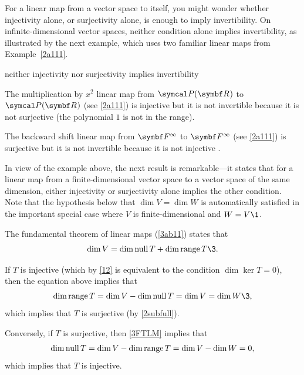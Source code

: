 For a linear map from a vector space to itself, you might wonder whether injectivity alone, or surjectivity alone, is enough to imply invertibility.  On infinite-dimensional vector spaces, neither condition alone implies invertibility, as illustrated by the next example, which uses two familiar linear maps from Example~\ref{2a111}.

\begin{example}[ninsii]{neither injectivity nor surjectivity implies invertibility}
\begin{Itemize}
\item
The multiplication by $x^2$ linear map from $\P(\R{})$ to $\P(\R{})$ (see \ref{2a111}) is injective but it is not invertible because it is not surjective (the polynomial $1$ is not in the range).
\item
The backward shift linear map from $\F{\infty}$ to $\F{\infty}$ (see \ref{2a111}) is surjective but it is not invertible because it is not injective .
\end{Itemize}
\exampleitemend
\end{example}

In view of the example above, the next result is remarkable---it states that for a linear map from a finite-dimensional vector space to a vector space of the same dimension, either injectivity or surjectivity alone implies the other condition. Note that the hypothesis below that $\dim V = \dim W$ is automatically satisfied in the important special case where $V$ is finite-dimensional and $W = V\1$.


\proof
The fundamental theorem of linear maps (\ref{3ab11}) states that
\begin{equation} \label{3FTLM}
\dim V = \dim \ker T + \dim \ran T\3.
\end{equation}%

If $T$ is injective (which by \ref{12} is equivalent to the condition $\dim \ker T = 0$), then the equation above implies that
\[
\dim \ran T = \dim V - \dim \ker T = \dim V = \dim W\3,
\]
which implies that $T$ is surjective (by \ref{2subfull}).

Conversely, if $T$ is surjective, then \ref{3FTLM} implies that
\[
\dim \operatorname{null} T = \dim V - \dim \operatorname{range} T = \dim V - \dim W = 0,
\]
which implies that $T$ is injective.

